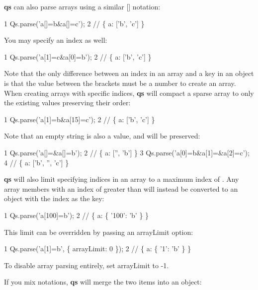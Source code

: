 {\bfseries qs} can also parse arrays using a similar {\ttfamily \mbox{[}\mbox{]}} notation\+:


\begin{DoxyCode}
1 Qs.parse('a[]=b&a[]=c');
2 // \{ a: ['b', 'c'] \}
\end{DoxyCode}


You may specify an index as well\+:


\begin{DoxyCode}
1 Qs.parse('a[1]=c&a[0]=b');
2 // \{ a: ['b', 'c'] \}
\end{DoxyCode}


Note that the only difference between an index in an array and a key in an object is that the value between the brackets must be a number to create an array. When creating arrays with specific indices, {\bfseries qs} will compact a sparse array to only the existing values preserving their order\+:


\begin{DoxyCode}
1 Qs.parse('a[1]=b&a[15]=c');
2 // \{ a: ['b', 'c'] \}
\end{DoxyCode}


Note that an empty string is also a value, and will be preserved\+:


\begin{DoxyCode}
1 Qs.parse('a[]=&a[]=b');
2 // \{ a: ['', 'b'] \}
3 Qs.parse('a[0]=b&a[1]=&a[2]=c');
4 // \{ a: ['b', '', 'c'] \}
\end{DoxyCode}


{\bfseries qs} will also limit specifying indices in an array to a maximum index of {}. Any array members with an index of greater than {} will instead be converted to an object with the index as the key\+:


\begin{DoxyCode}
1 Qs.parse('a[100]=b');
2 // \{ a: \{ '100': 'b' \} \}
\end{DoxyCode}


This limit can be overridden by passing an {\ttfamily array\+Limit} option\+:


\begin{DoxyCode}
1 Qs.parse('a[1]=b', \{ arrayLimit: 0 \});
2 // \{ a: \{ '1': 'b' \} \}
\end{DoxyCode}


To disable array parsing entirely, set {\ttfamily array\+Limit} to {\ttfamily -\/1}.

If you mix notations, {\bfseries qs} will merge the two items into an object\+:


